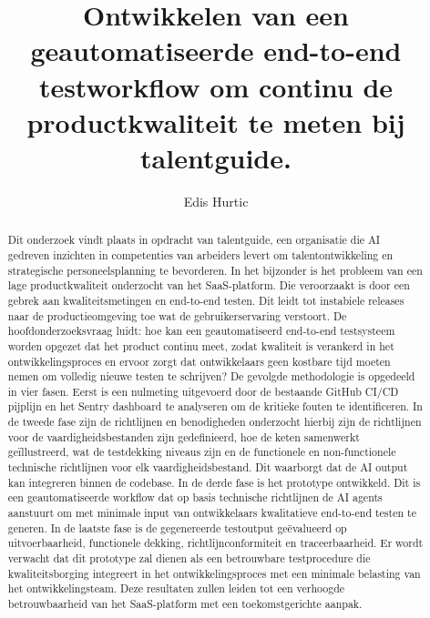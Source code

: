 \documentclass[a0,portrait]{hogent-poster}
\title{Ontwikkelen van een geautomatiseerde end-to-end testworkflow om continu de productkwaliteit te meten bij talentguide.}
\author{Edis Hurtic}
\begin{document}
\maketitle

\begin{abstract}
Dit onderzoek vindt plaats in opdracht van talentguide, een organisatie die AI gedreven inzichten in competenties van arbeiders levert om talentontwikkeling en strategische personeelsplanning te bevorderen. In het bijzonder is het probleem van een lage productkwaliteit onderzocht van het SaaS-platform. Die veroorzaakt is door een gebrek aan kwaliteitsmetingen en end-to-end testen. Dit leidt tot instabiele releases naar de productieomgeving toe wat de gebruikerservaring verstoort.
De hoofdonderzoeksvraag luidt: hoe kan een geautomatiseerd end-to-end testsysteem worden opgezet dat het product continu meet, zodat kwaliteit is verankerd in het ontwikkelingsproces en ervoor zorgt dat ontwikkelaars geen kostbare tijd moeten nemen om volledig nieuwe testen te schrijven?
De gevolgde methodologie is opgedeeld in vier fasen. Eerst is een nulmeting uitgevoerd door de bestaande GitHub CI/CD pijplijn en het Sentry dashboard te analyseren om de kritieke fouten te identificeren.
In de tweede fase zijn de richtlijnen en benodigheden onderzocht hierbij zijn de richtlijnen voor de vaardigheidsbestanden zijn gedefinieerd, hoe de keten samenwerkt geïllustreerd, wat de testdekking niveaus zijn en de functionele en non-functionele technische richtlijnen voor elk vaardigheidsbestand. Dit waarborgt dat de AI output kan integreren binnen de codebase.
In de derde fase is het prototype ontwikkeld. Dit is een geautomatiseerde workflow dat op basis technische richtlijnen de AI agents aanstuurt om met minimale input van ontwikkelaars kwalitatieve end-to-end testen te generen. 
In de laatste fase is de gegenereerde testoutput geëvalueerd op uitvoerbaarheid, functionele dekking, richtlijnconformiteit en traceerbaarheid.
Er wordt verwacht dat dit prototype zal dienen als een betrouwbare testprocedure die kwaliteitsborging integreert in het ontwikkelingsproces met een minimale belasting van het ontwikkelingsteam. Deze resultaten zullen leiden tot een verhoogde betrouwbaarheid van het SaaS-platform met een toekomstgerichte aanpak.
\end{abstract}
\end{document}
